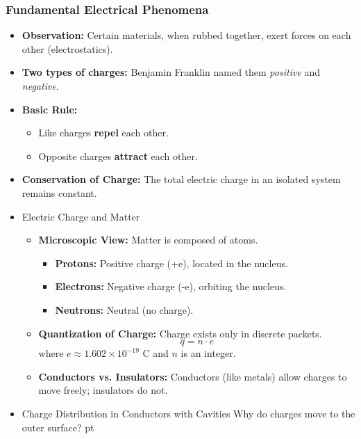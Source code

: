 \documentclass[t,aspectratio=169]{beamer}
\begin{document}
\begin{frame}
\frametitle{Fundamental Electrical Phenomena}
\begin{itemize}
\setlength{\parskip}{0pt}
\setlength{\itemsep}{4pt}
\item \textbf{Observation:} Certain materials, when rubbed together, exert forces on each other (electrostatics).
\item \textbf{Two types of charges:} Benjamin Franklin named them \textit{positive} and \textit{negative}.
\item \textbf{Basic Rule:} 
\begin{itemize}
\item Like charges \textbf{repel} each other.
\item Opposite charges \textbf{attract} each other.
\end{itemize}
\item \textbf{Conservation of Charge:} The total electric charge in an isolated system remains constant.

  \pagebreak

  
\item Electric Charge and Matter
    \begin{itemize}
        \item \textbf{Microscopic View:} Matter is composed of atoms.
        \begin{itemize}
            \item \textbf{Protons:} Positive charge (+e), located in the nucleus.
            \item \textbf{Electrons:} Negative charge (-e), orbiting the nucleus.
            \item \textbf{Neutrons:} Neutral (no charge).
        \end{itemize}
        \item \textbf{Quantization of Charge:} Charge exists only in discrete packets. 
        $$ q = n \cdot e $$
        where $e \approx 1.602 \times 10^{-19}$ C and $n$ is an integer.
        \item \textbf{Conductors vs. Insulators:} Conductors (like metals) allow charges to move freely; insulators do not.
        \end{itemize}

\pagebreak
\item Charge Distribution in Conductors with Cavities Why do charges move to the outer surface?
 pt
\begin{columns}


\end{columns}
\end{itemize}
\end{frame}
\end{document}
